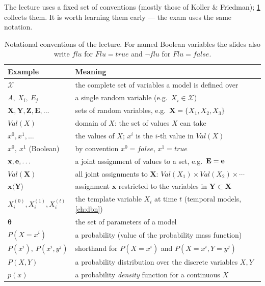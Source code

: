 \documentclass[11pt, oneside]{book}
\newcommand{\params}{\boldsymbol{\theta}}   %
\newcommand{\Val}{\mathit{Val}}          %
\newcommand{\Xall}{\mathcal{X}}          %
\newcommand{\bX}{\mathbf{X}}  \newcommand{\bY}{\mathbf{Y}}
\newcommand{\bZ}{\mathbf{Z}}  \newcommand{\bE}{\mathbf{E}}
\newcommand{\bx}{\mathbf{x}}  \newcommand{\by}{\mathbf{y}}
\newcommand{\vn}[1]{\mathit{#1}}         %
\begin{document}
The lecture uses a fixed set of conventions (mostly those of Koller \&
Friedman); \cref{tab:notation} collects them. It is worth learning them early
--- the exam uses the same notation.

\begin{table}[htbp]
\centering
\small
\renewcommand{\arraystretch}{1.15}
\begin{tabular}{@{}ll@{}}
\toprule
\textbf{Example} & \textbf{Meaning} \\
\midrule
$\Xall$ & the complete set of variables a model is defined over \\
$A,\ X_i,\ E_j$ & a single random variable (e.g.\ $X_i \in \Xall$) \\
$\bX, \bY, \bZ, \bE, \ldots$ & sets of random variables, e.g.\ $\bX = \{X_1, X_2, X_3\}$ \\
$\Val(X)$ & domain of $X$: the set of values $X$ can take \\
$x^0, x^1, \ldots$ & the values of $X$; $x^i$ is the $i$-th value in $\Val(X)$ \\
$x^0,\ x^1$ (Boolean) & by convention $x^0 = \vn{false}$, $x^1 = \vn{true}$ \\
$\bx, \be, \ldots$ & a joint assignment of values to a set, e.g.\ $\bE = \be$ \\
$\Val(\bX)$ & all joint assignments to $\bX$: $\Val(X_1) \times \Val(X_2) \times \cdots$ \\
$\bx\langle\bY\rangle$ & assignment $\bx$ restricted to the variables in $\bY \subset \bX$ \\
$X_i^{(0)}, X_i^{(1)}, X_i^{(t)}$ & the template variable $X_i$ at time $t$ (temporal models, \cref{ch:dbn}) \\
$\params$ & the set of parameters of a model \\
$P(X = x^i)$ & a probability (value of the probability mass function) \\
$P(x^i),\ P(x^i, y^j)$ & shorthand for $P(X = x^i)$ and $P(X = x^i, Y = y^j)$ \\
$P(X, Y)$ & a probability distribution over the discrete variables $X, Y$ \\
$p(x)$ & a probability \emph{density} function for a continuous $X$ \\
\bottomrule
\end{tabular}
\caption{Notational conventions of the lecture. For named Boolean variables
the slides also write $\vn{flu}$ for $\vn{Flu} = \vn{true}$ and
$\neg\vn{flu}$ for $\vn{Flu} = \vn{false}$.}
\label{tab:notation}
\end{table}
\end{document}
